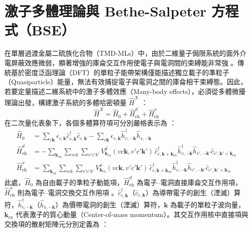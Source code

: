 \section{激子多體理論與 Bethe-Salpeter 方程式（BSE）}
\label{sec:theory_BSE}

在單層過渡金屬二硫族化合物（TMD-MLs）中，由於二維量子侷限系統的面外介電屏蔽效應微弱，顯著增強的庫侖交互作用使電子與電洞間的束縛能非常強 \cite{chernikov2014}。傳統基於密度泛函理論（DFT）的單粒子能帶架構僅能描述獨立載子的準粒子（Quasiparticle）能量，無法有效捕捉電子與電洞之間的庫侖相干束縛態。因此，若要定量描述二維系統中的激子多體效應（Many-body effects），必須從多體微擾理論出發，構建激子系統的多體哈密頓量 $\hat{H}^{X}$ \cite{Lin2024Phd,Haug2009}：
\begin{equation}
	\hat{H}^{X} = \hat{H}_0 + \hat{H}_{\mathrm{eh}}^d + \hat{H}_{\mathrm{eh}}^x
	\label{eq:H_exciton_total}
\end{equation}
在二次量化表象下，各個多體算符項可分別嚴格表示為 \cite{Lin2024Phd,Haug2009}：
\begin{align}
	\hat{H}_0 &= \sum_{c\mathbf{k}}\epsilon_{c,\mathbf{k}}\hat{c}_{c,\mathbf{k}}^{\dagger}\hat{c}_{c,\mathbf{k}} - \sum_{v\mathbf{k}}\epsilon_{v,\mathbf{k}}\hat{h}_{v,-\mathbf{k}}^{\dagger}\hat{h}_{v,-\mathbf{k}} \label{eq:H0_op} \\
	\hat{H}_{\mathrm{eh}}^d &= -\sum_{\mathbf{k}_{\mathrm{ex}}}\sum_{vck}\sum_{v'c'k'} V_{\mathbf{k}_{\mathrm{ex}}}^d(vc\mathbf{k}, v'c'\mathbf{k}') \, \hat{c}_{c,\mathbf{k}+\mathbf{k}_{\mathrm{ex}}}^{\dagger}\hat{h}_{v,-\mathbf{k}}^{\dagger}\hat{h}_{v',-\mathbf{k}'}\hat{c}_{c',\mathbf{k}'+\mathbf{k}_{\mathrm{ex}}} \label{eq:Hd_op} \\
	\hat{H}_{\mathrm{eh}}^x &= \sum_{\mathbf{k}_{\mathrm{ex}}}\sum_{vck}\sum_{v'c'k'} V_{\mathbf{k}_{\mathrm{ex}}}^x(vc\mathbf{k}, v'c'\mathbf{k}') \, \hat{c}_{c,\mathbf{k}+\mathbf{k}_{\mathrm{ex}}}^{\dagger}\hat{h}_{v,-\mathbf{k}}^{\dagger}\hat{h}_{v',-\mathbf{k}'}\hat{c}_{c',\mathbf{k}'+\mathbf{k}_{\mathrm{ex}}} \label{eq:Hx_op}
\end{align}
此處，$\hat{H}_0$ 為自由載子的準粒子動能項，$\hat{H}_{\mathrm{eh}}^d$ 為電子--電洞直接庫侖交互作用項，$\hat{H}_{\mathrm{eh}}^x$ 則為電子--電洞交換交互作用項 \cite{Haug2009}。$\hat{c}_{c,\mathbf{k}}^{\dagger}$（$\hat{c}_{c,\mathbf{k}}$）為導帶電子的創生（湮滅）算符，$\hat{h}_{v,-\mathbf{k}}^{\dagger}$（$\hat{h}_{v,-\mathbf{k}}$）為價帶電洞的創生（湮滅）算符，$\mathbf{k}$ 為載子的單粒子波向量，$\mathbf{k}_{\mathrm{ex}}$ 代表激子的質心動量（Center-of-mass momentum）\cite{Lin2024Phd}。其交互作用核中直接項與交換項的散射矩陣元分別定義為 \cite{Lin2024Phd,Haug2009}：
